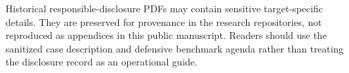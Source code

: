 Historical responsible-disclosure PDFs may contain sensitive target-specific details. They are preserved for provenance in the research repositories, not reproduced as appendices in this public manuscript. Readers should use the sanitized case description and defensive benchmark agenda rather than treating the disclosure record as an operational guide.
